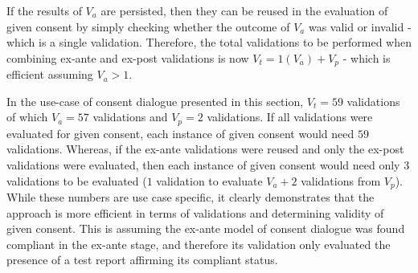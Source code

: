 If the results of $V_{a}$ are persisted, then they can be reused in the evaluation of given consent by simply checking whether the outcome of $V_{a}$ was valid or invalid - which is a single validation. Therefore, the total validations to be performed when combining ex-ante and ex-post validations is now $V_{t} = 1(V_{a}) + V_{p}$ - which is efficient assuming $V_{a} > 1$.

In the use-case of consent dialogue presented in this section, $V_{t}=59$ validations of which $V_{a}=57$ validations and $V_{p}=2$ validations. If all validations were evaluated for given consent, each instance of given consent would need $59$ validations. Whereas, if the ex-ante validations were reused and only the ex-post validations were evaluated, then each instance of given consent would need only $3$ validations to be evaluated ($1$ validation to evaluate $V_{a} + 2$ validations from $V_{p}$). While these numbers are use case specific, it clearly demonstrates that the approach is more efficient in terms of validations and determining validity of given consent. This is assuming the ex-ante model of consent dialogue was found compliant in the ex-ante stage, and therefore its validation only evaluated the presence of a test report affirming its compliant status.

